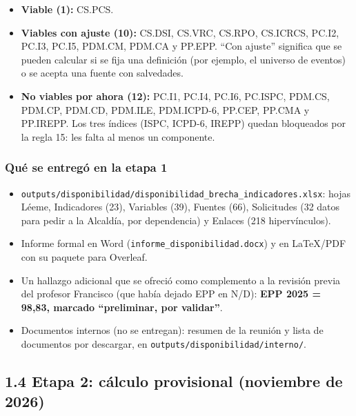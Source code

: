 \documentclass[11pt,letterpaper]{article}
\begin{document}
\begin{itemize}
\item \textbf{Viable (1):} CS.PCS.
\item \textbf{Viables con ajuste (10):} CS.DSI, CS.VRC, CS.RPO, CS.ICRCS, PC.I2, PC.I3, PC.I5, PDM.CM, PDM.CA y PP.EPP. ``Con ajuste'' significa que se pueden calcular si se fija una definición (por ejemplo, el universo de eventos) o se acepta una fuente con salvedades.
\item \textbf{No viables por ahora (12):} PC.I1, PC.I4, PC.I6, PC.ISPC, PDM.CS, PDM.CP, PDM.CD, PDM.ILE, PDM.ICPD-6, PP.CEP, PP.CMA y PP.IREPP. Los tres índices (ISPC, ICPD-6, IREPP) quedan bloqueados por la regla 15: les falta al menos un componente.
\end{itemize}

\subsubsection*{Qué se entregó en la etapa 1}

\begin{itemize}
\item \texttt{\footnotesize outputs/\allowbreak{}disponibilidad/\allowbreak{}disponibilidad\_\allowbreak{}brecha\_\allowbreak{}indicadores.\allowbreak{}xlsx}: hojas Léeme, Indicadores (23), Variables (39), Fuentes (66), Solicitudes (32 datos para pedir a la Alcaldía, por dependencia) y Enlaces (218 hipervínculos).
\item Informe formal en Word (\texttt{\footnotesize informe\_\allowbreak{}disponibilidad.\allowbreak{}docx}) y en LaTeX/PDF con su paquete para Overleaf.
\item Un hallazgo adicional que se ofreció como complemento a la revisión previa del profesor Francisco (que había dejado EPP en N/D): \textbf{EPP 2025 = 98,83, marcado ``preliminar, por validar''}.
\item Documentos internos (no se entregan): resumen de la reunión y lista de documentos por descargar, en \texttt{\footnotesize outputs/\allowbreak{}disponibilidad/\allowbreak{}interno/\allowbreak{}}.
\end{itemize}

\subsection*{1.4 Etapa 2: cálculo provisional (noviembre de 2026)}

\end{document}
